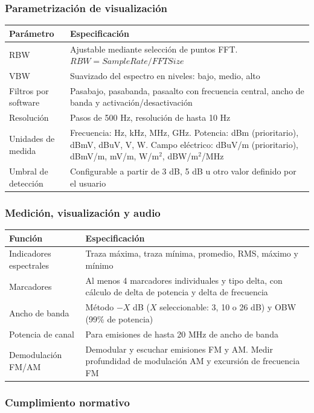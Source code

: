 \subsubsection{Parametrización de visualización}

\begin{tabularx}{\textwidth}{@{}l X@{}}
\toprule
Parámetro & Especificación \\
\midrule
RBW & Ajustable mediante selección de puntos FFT. $RBW = Sample Rate / FFT Size$ \\
VBW & Suavizado del espectro en niveles: bajo, medio, alto \\
Filtros por software & Pasabajo, pasabanda, pasaalto con frecuencia central, ancho de banda y activación/desactivación \\
Resolución & Pasos de 500 Hz, resolución de hasta 10 Hz \\
Unidades de medida & Frecuencia: Hz, kHz, MHz, GHz. Potencia: dBm (prioritario), dBmV, dBuV, V, W. Campo eléctrico: dBuV/m (prioritario), dBmV/m, mV/m, W/m$^2$, dBW/m$^2$/MHz \\
Umbral de detección & Configurable a partir de 3 dB, 5 dB u otro valor definido por el usuario \\
\bottomrule
\end{tabularx}

\subsubsection{Medición, visualización y audio}

\begin{tabularx}{\textwidth}{@{}l X@{}}
\toprule
Función & Especificación \\
\midrule
Indicadores espectrales & Traza máxima, traza mínima, promedio, RMS, máximo y mínimo \\
Marcadores & Al menos 4 marcadores individuales y tipo delta, con cálculo de delta de potencia y delta de frecuencia \\
Ancho de banda & Método $-X$ dB ($X$ seleccionable: 3, 10 o 26 dB) y OBW (99\% de potencia) \\
Potencia de canal & Para emisiones de hasta 20 MHz de ancho de banda \\
Demodulación FM/AM & Demodular y escuchar emisiones FM y AM. Medir profundidad de modulación AM y excursión de frecuencia FM \\
\bottomrule
\end{tabularx}

\subsubsection{Cumplimiento normativo}

